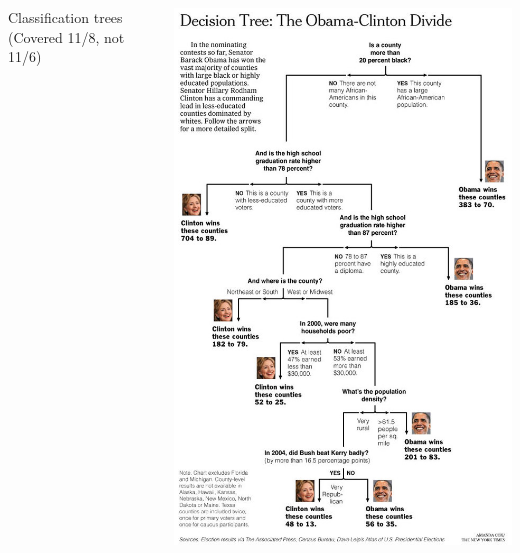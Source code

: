 \documentclass[mathserif, aspectratio=169]{beamer}
\begin{document}
\begin{frame}
\begin{columns}
\begin{center}
{\LARGE Classification trees} (Covered 11/8, not 11/6)
\end{center}
\includegraphics[height=\textheight]{NYT_tree}
\end{columns}
\end{frame}
\end{document}
